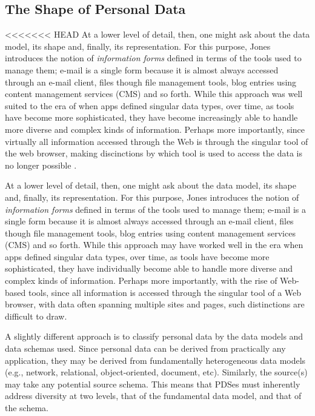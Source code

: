 \documentclass[runningheads,a4paper]{llncs}
\begin{document}
\subsection{The Shape of Personal Data}

<<<<<<< HEAD
At a lower level of detail, then, one might ask about the data model, its shape and, finally, its representation.  For this purpose, Jones introduces the notion of \emph{information forms} defined in terms of the tools used to manage them; e-mail is a single form because it is almost always accessed through an e-mail client, files though file management tools, blog entries using content management services (CMS) and so forth.  While this approach was well suited to the era of when apps defined singular data types, over time, as tools have become more sophisticated, they have become increasingly able to handle more diverse and complex kinds of information.  Perhaps more importantly, since virtually all information accessed through the Web is through the singular tool of the web browser, making discinctions by which tool is used to access the data is no longer possible .

At a lower level of detail, then, one might ask about the data model, its shape and, finally, its representation.  For this purpose, Jones introduces the notion of \emph{information forms} defined in terms of the tools used to manage them; e-mail is a single form because it is almost always accessed through an e-mail client, files though file management tools, blog entries using content management services (CMS) and so forth.  While this approach may have worked well in the era when apps defined singular data types, over time, as tools have become more sophisticated, they have individually become  able to handle more diverse and complex kinds of information.  Perhaps more importantly, with the rise of Web-based tools, since all information is accessed through the singular tool of a Web browser, with data often spanning multiple sites and pages, such distinctions are difficult to draw.

A slightly different approach is to classify personal data by the data models and data schemas used.  Since personal data can be derived from practically any application, they may be derived from fundamentally heterogeneous data models (e.g., network, relational, object-oriented, document, etc). Similarly, the source(s) may take any potential source schema.  This means that PDSes must inherently address diversity at two levels, that of the fundamental data model, and that of the schema.
\end{document}
